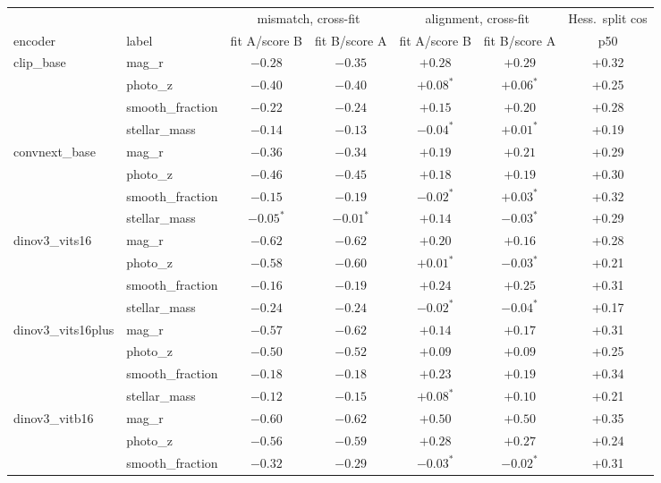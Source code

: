 \begin{table}[h]
\centering\footnotesize\setlength{\tabcolsep}{3.5pt}
\begin{tabular}{llccccc}
\toprule
 & & \multicolumn{2}{c}{mismatch, cross-fit} & \multicolumn{2}{c}{alignment, cross-fit} & Hess.\ split cos \\
encoder & label & fit A/score B & fit B/score A & fit A/score B & fit B/score A & p50 \\
\midrule
clip\_base & mag\_r & $-0.28$ & $-0.35$ & $+0.28$ & $+0.29$ & +0.32 \\
 & photo\_z & $-0.40$ & $-0.40$ & $+0.08^{*}$ & $+0.06^{*}$ & +0.25 \\
 & smooth\_fraction & $-0.22$ & $-0.24$ & $+0.15$ & $+0.20$ & +0.28 \\
 & stellar\_mass & $-0.14$ & $-0.13$ & $-0.04^{*}$ & $+0.01^{*}$ & +0.19 \\
\addlinespace[2pt]
convnext\_base & mag\_r & $-0.36$ & $-0.34$ & $+0.19$ & $+0.21$ & +0.29 \\
 & photo\_z & $-0.46$ & $-0.45$ & $+0.18$ & $+0.19$ & +0.30 \\
 & smooth\_fraction & $-0.15$ & $-0.19$ & $-0.02^{*}$ & $+0.03^{*}$ & +0.32 \\
 & stellar\_mass & $-0.05^{*}$ & $-0.01^{*}$ & $+0.14$ & $-0.03^{*}$ & +0.29 \\
\addlinespace[2pt]
dinov3\_vits16 & mag\_r & $-0.62$ & $-0.62$ & $+0.20$ & $+0.16$ & +0.28 \\
 & photo\_z & $-0.58$ & $-0.60$ & $+0.01^{*}$ & $-0.03^{*}$ & +0.21 \\
 & smooth\_fraction & $-0.16$ & $-0.19$ & $+0.24$ & $+0.25$ & +0.31 \\
 & stellar\_mass & $-0.24$ & $-0.24$ & $-0.02^{*}$ & $-0.04^{*}$ & +0.17 \\
\addlinespace[2pt]
dinov3\_vits16plus & mag\_r & $-0.57$ & $-0.62$ & $+0.14$ & $+0.17$ & +0.31 \\
 & photo\_z & $-0.50$ & $-0.52$ & $+0.09$ & $+0.09$ & +0.25 \\
 & smooth\_fraction & $-0.18$ & $-0.18$ & $+0.23$ & $+0.19$ & +0.34 \\
 & stellar\_mass & $-0.12$ & $-0.15$ & $+0.08^{*}$ & $+0.10$ & +0.21 \\
\addlinespace[2pt]
dinov3\_vitb16 & mag\_r & $-0.60$ & $-0.62$ & $+0.50$ & $+0.50$ & +0.35 \\
 & photo\_z & $-0.56$ & $-0.59$ & $+0.28$ & $+0.27$ & +0.24 \\
 & smooth\_fraction & $-0.32$ & $-0.29$ & $-0.03^{*}$ & $-0.02^{*}$ & +0.31 \\

\end{tabular}
\end{table}
